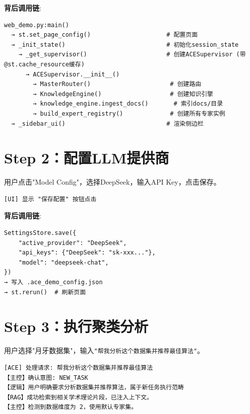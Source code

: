 \documentclass[11pt,a4paper]{ctexbook}
\begin{document}
\textbf{背后调用链}:
\begin{verbatim}
web_demo.py:main()
  → st.set_page_config()                     # 配置页面
  → _init_state()                            # 初始化session_state
    → _get_supervisor()                      # 创建ACESupervisor (带@st.cache_resource缓存)
      → ACESupervisor.__init__()
        → MasterRouter()                      # 创建路由
        → KnowledgeEngine()                   # 创建知识引擎
        → knowledge_engine.ingest_docs()       # 索引docs/目录
        → build_expert_registry()             # 创建所有专家实例
  → _sidebar_ui()                            # 渲染侧边栏
\end{verbatim}

\section{Step 2：配置LLM提供商}

用户点击"Model Config"，选择DeepSeek，输入API Key，点击保存。

\begin{verbatim}
[UI] 显示 "保存配置" 按钮点击
\end{verbatim}

\textbf{背后调用链}:
\begin{verbatim}
SettingsStore.save({
    "active_provider": "DeepSeek",
    "api_keys": {"DeepSeek": "sk-xxx..."},
    "model": "deepseek-chat",
})
→ 写入 .ace_demo_config.json
→ st.rerun()  # 刷新页面
\end{verbatim}

\section{Step 3：执行聚类分析}

用户选择"月牙数据集"，输入\verb|"帮我分析这个数据集并推荐最佳算法"|。

\begin{verbatim}
[ACE] 处理请求: 帮我分析这个数据集并推荐最佳算法
【主控】确认意图: NEW_TASK
【逻辑】用户明确要求分析数据集并推荐算法，属于新任务执行范畴
【RAG】成功检索到相关学术理论片段，已注入上下文。
【主控】检测到数据维度为 2，使用默认专家集。
\end{verbatim}
\end{document}
